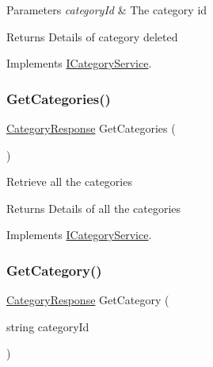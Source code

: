 \begin{DoxyParams}{Parameters}
{\em category\+Id} & The category id\\
\hline
\end{DoxyParams}
\begin{DoxyReturn}{Returns}
Details of category deleted
\end{DoxyReturn}


Implements \hyperlink{interfaceWildLifeTracker_1_1ICategoryService_a6479e2a6945b14d40e8c57642e9d2665}{I\+Category\+Service}.

\mbox{\label{classWildLifeTracker_1_1CategoryService_af5ed969c812807a721f06819c9b22356}} 
\subsubsection{\texorpdfstring{Get\+Categories()}{GetCategories()}}
{\footnotesize\ttfamily \hyperlink{classWildLifeTracker_1_1Response_1_1CategoryResponse}{Category\+Response} Get\+Categories (\begin{DoxyParamCaption}{ }\end{DoxyParamCaption})\hspace{0.3cm}{\ttfamily [inline]}}



Retrieve all the categories 

\begin{DoxyReturn}{Returns}
Details of all the categories
\end{DoxyReturn}


Implements \hyperlink{interfaceWildLifeTracker_1_1ICategoryService_af5ed969c812807a721f06819c9b22356}{I\+Category\+Service}.

\mbox{\label{classWildLifeTracker_1_1CategoryService_ac989af6747cc8b28f508ef7a4645d22f}} 
\subsubsection{\texorpdfstring{Get\+Category()}{GetCategory()}}
{\footnotesize\ttfamily \hyperlink{classWildLifeTracker_1_1Response_1_1CategoryResponse}{Category\+Response} Get\+Category (\begin{DoxyParamCaption}\item[{string}]{category\+Id }\end{DoxyParamCaption})\hspace{0.3cm}{\ttfamily [inline]}}



